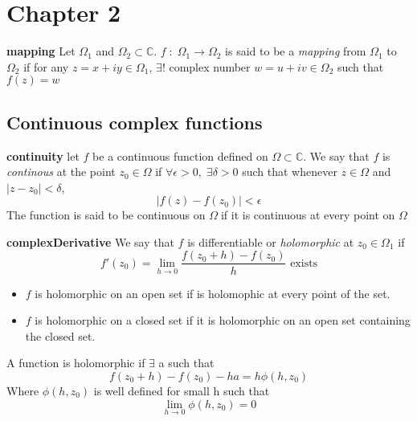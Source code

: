 \documentclass{article}
\newenvironment{definition}[1][Definition]{\begin{trivlist}
\item[\hskip \labelsep {\bfseries #1}]}{\end{trivlist}}
\newcommand{\C}{\mathbb{C}}
\newcommand{\OO}{$ \Omega \;$}
\begin{document}
\section*{Chapter 2} %
\setcounter{section}{2}

\begin{definition} \label{mapping} \textbf{mapping}
    Let $\Omega_1$ and $\Omega_2 \subset \C$. $f\;:\; \Omega_1 \rightarrow \Omega_2$
    is said to be a \textit{mapping} from $\Omega_1$ to $\Omega_2$ if for any
    $z = x +iy \in \Omega_1$, $\exists$! complex number $w = u + iv \in \Omega_2$ such that
    $f(z) = w$
\end{definition}

\subsection*{Continuous complex functions}
\begin{definition} \label{continuity} \textbf{continuity}
    let $f$ be a continuous function defined on $\Omega \subset \C$. We say that $f$ is
    \textit{continous} at the point $z_0 \in \Omega$ if $\forall\epsilon > 0,\; \exists\delta > 0$
    such that whenever $z \in \Omega$ and $|z-z_0| < \delta$, $$|f(z) - f(z_0)| < \epsilon$$
    The function is said to be continuous on \OO if it is continuous at every point on \OO
\end{definition}

\begin{definition} \label{complexDerivative} \textbf{complexDerivative}
    We say that $f$ is differentiable or \textit{holomorphic} at $z_0 \in \Omega_1$ if
    \[f'(z_0) = \lim_{h\rightarrow 0}\frac{f(z_0+h)-f(z_0)}{h}\text{ exists}\]
\end{definition}
\begin{itemize}
    \item $f$ is holomorphic on an open set if is holomophic at every point of the set.\\
    \item $f$ is holomorphic on a closed set if it is holomorphic on an open set containing the closed set.
\end{itemize}

\begin{definition}
    A function is holomorphic if $\exists$ a such that
    \[ f(z_0 +h) - f(z_0) - ha = h\phi(h, z_0) \]
    Where $\phi(h, z_0)$ is well defined for small h such that
    \[ \lim_{h\rightarrow 0} \phi(h, z_0) = 0 \]
\end{definition}
\end{document}

